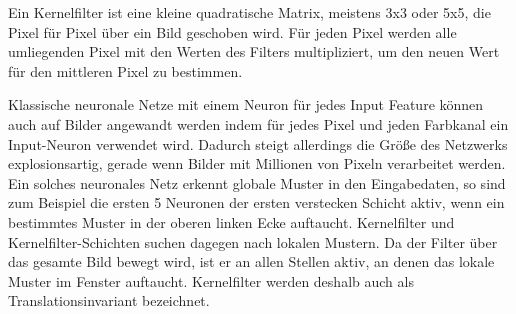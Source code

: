 Ein Kernelfilter ist eine kleine quadratische Matrix, meistens 3x3 oder 5x5, die Pixel für Pixel über ein Bild geschoben wird.
Für jeden Pixel werden alle umliegenden Pixel mit den Werten des Filters multipliziert, um den neuen Wert für den mittleren Pixel zu bestimmen.

Klassische neuronale Netze mit einem Neuron für jedes Input Feature können auch auf Bilder angewandt werden indem für jedes Pixel und jeden Farbkanal ein Input-Neuron verwendet wird.
Dadurch steigt allerdings die Größe des Netzwerks explosionsartig, gerade wenn Bilder mit Millionen von Pixeln verarbeitet werden.
Ein solches neuronales Netz erkennt globale Muster in den Eingabedaten, so sind zum Beispiel die ersten 5 Neuronen der ersten verstecken Schicht aktiv, wenn ein bestimmtes Muster in der oberen linken Ecke auftaucht.
Kernelfilter und Kernelfilter-Schichten suchen dagegen nach lokalen Mustern.
Da der Filter über das gesamte Bild bewegt wird, ist er an allen Stellen aktiv, an denen das lokale Muster im Fenster auftaucht.
Kernelfilter werden deshalb auch als Translationsinvariant bezeichnet.
